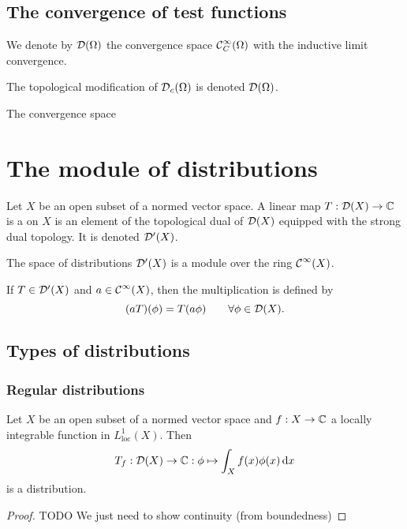 \subsection{The convergence of test functions}

\begin{definition}
We denote by $\operatorname{\mathcal{D}}(\Omega)$ the convergence space $\operatorname{\mathcal{C}}^\infty_C(\Omega)$ with the inductive limit convergence.

The topological modification of $\operatorname{\mathcal{D}}_c(\Omega)$ is denoted $\operatorname{\mathcal{D}}(\Omega)$.
\end{definition}

\begin{lemma}
The convergence space
\end{lemma}



\section{The module of distributions}
\begin{definition}
    Let $X$ be an open subset of a normed vector space.
    A linear map $T: \operatorname{\mathcal{D}}(X) \to \mathbb{C}$ is a  on $X$ is an element of the topological dual of $\operatorname{\mathcal{D}}(X)$ equipped with the strong dual topology. It is denoted $\operatorname{\mathcal{D}^\prime}(X)$.
\end{definition}

\begin{proposition}
    The space of distributions $\operatorname{\mathcal{D}^\prime}(X)$ is a module over the ring $\operatorname{\mathcal{C}}^\infty(X)$.
    
    If $T\in \operatorname{\mathcal{D}^\prime}(X)$ and $a\in \operatorname{\mathcal{C}}^\infty(X)$, then the multiplication is defined by
    \[ (aT)(\phi) = T(a\phi) \qquad \forall \phi \in \operatorname{\mathcal{D}}(X). \]
\end{proposition}

\subsection{Types of distributions}
\subsubsection{Regular distributions}
\begin{lemma}
Let $X$ be an open subset of a normed vector space and $f: X\to\mathbb{C}$ a locally integrable function in $L^1_\text{loc}(X)$. Then
\[ T_f: \operatorname{\mathcal{D}}(X) \to \mathbb{C}: \phi \mapsto \int_X f(x)\phi(x)\operatorname{d \!}{x} \]
is a distribution.
\end{lemma}
\begin{proof}
TODO We just need to show continuity (from boundedness)
\end{proof}

